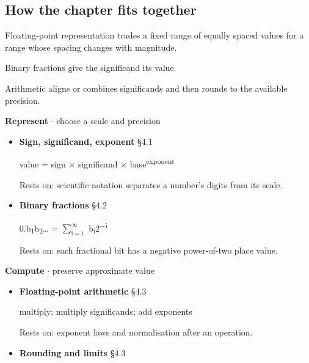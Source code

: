 \documentclass[11pt]{article}
\begin{document}
\begin{keepsection}
\section{How the chapter fits together}

Floating-point representation trades a fixed range of equally spaced values for a range whose spacing changes with magnitude.

Binary fractions give the significand its value.

Arithmetic aligns or combines significands and then rounds to the available precision.

\textbf{Represent} \ensuremath{\cdot} choose a scale and precision

\begin{itemize}
\item {}
\textbf{Sign, significand, exponent} \hfill{\small\color{FAUblue}§4.1}

value = sign \ensuremath{\times} significand \ensuremath{\times} base\textsuperscript{exponent}

Rests on: scientific notation separates a number’s digits from its scale.
\item {}
\textbf{Binary fractions} \hfill{\small\color{FAUblue}§4.2}

0.b\textsubscript{1}b\textsubscript{2}… = $\sum_{\mathrm{i}=1}^{\infty } $ b\textsubscript{i}2\textsuperscript{\ensuremath{-}i}

Rests on: each fractional bit has a negative power-of-two place value.
\end{itemize}

\textbf{Compute} \ensuremath{\cdot} preserve approximate value

\begin{itemize}
\item {}
\textbf{Floating-point arithmetic} \hfill{\small\color{FAUblue}§4.3}

multiply: multiply significands; add exponents

Rests on: exponent laws and normalisation after an operation.
\item {}
\textbf{Rounding and limits} \hfill{\small\color{FAUblue}§4.3}


\end{itemize}
\end{keepsection}
\end{document}
